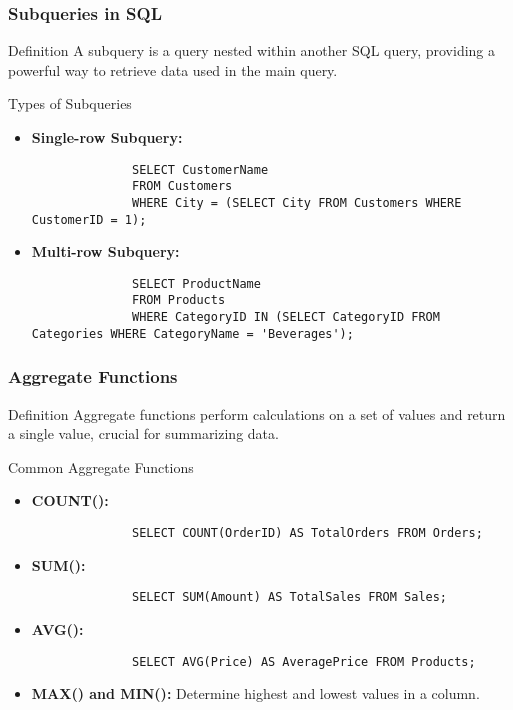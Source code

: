 \documentclass[aspectratio=169]{beamer}
\begin{document}
\begin{frame}[fragile]
    \frametitle{Subqueries in SQL}
    \begin{block}{Definition}
        A subquery is a query nested within another SQL query, providing a powerful way to retrieve data used in the main query.
    \end{block}

    \begin{block}{Types of Subqueries}
        \begin{itemize}
            \item \textbf{Single-row Subquery:}
            \begin{lstlisting}
              SELECT CustomerName
              FROM Customers
              WHERE City = (SELECT City FROM Customers WHERE CustomerID = 1);
            \end{lstlisting}
            \item \textbf{Multi-row Subquery:}
            \begin{lstlisting}
              SELECT ProductName
              FROM Products
              WHERE CategoryID IN (SELECT CategoryID FROM Categories WHERE CategoryName = 'Beverages');
            \end{lstlisting}
        \end{itemize}
    \end{block}
\end{frame}

\begin{frame}[fragile]
    \frametitle{Aggregate Functions}
    \begin{block}{Definition}
        Aggregate functions perform calculations on a set of values and return a single value, crucial for summarizing data.
    \end{block}

    \begin{block}{Common Aggregate Functions}
        \begin{itemize}
            \item \textbf{COUNT():}
            \begin{lstlisting}
              SELECT COUNT(OrderID) AS TotalOrders FROM Orders;
            \end{lstlisting}
            \item \textbf{SUM():}
            \begin{lstlisting}
              SELECT SUM(Amount) AS TotalSales FROM Sales;
            \end{lstlisting}
            \item \textbf{AVG():}
            \begin{lstlisting}
              SELECT AVG(Price) AS AveragePrice FROM Products;
            \end{lstlisting}
            \item \textbf{MAX() and MIN():} Determine highest and lowest values in a column.
        \end{itemize}
    \end{block}
\end{frame}
\end{document}
